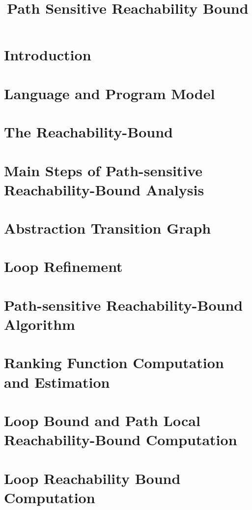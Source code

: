 \documentclass[a4paper,11pt]{article}
\begin{document}
\title{Path Sensitive Reachability Bound}

\author{}

\date{}

\maketitle
%
\tableofcontents


\section{Introduction}
\section{{Language and Program Model}}
\label{sec:language}

\section{{The Reachability-Bound}}
\label{sec:execution_rb}

\section{Main Steps of Path-sensitive Reachability-Bound Analysis}
\label{sec:static_rb}

\section{Abstraction Transition Graph}
\label{sec:progabs}

\section{Loop Refinement}
\label{sec:refine}

\section{Path-sensitive Reachability-Bound Algorithm}
\label{sec:psrb}

\section{Ranking Function Computation and Estimation}
\label{sec:rank}

\section{Loop Bound and Path Local Reachability-Bound Computation}
\label{sec:pathlocalrb}

\section{Loop Reachability Bound Computation}
\label{sec:looprb}

\end{document}
